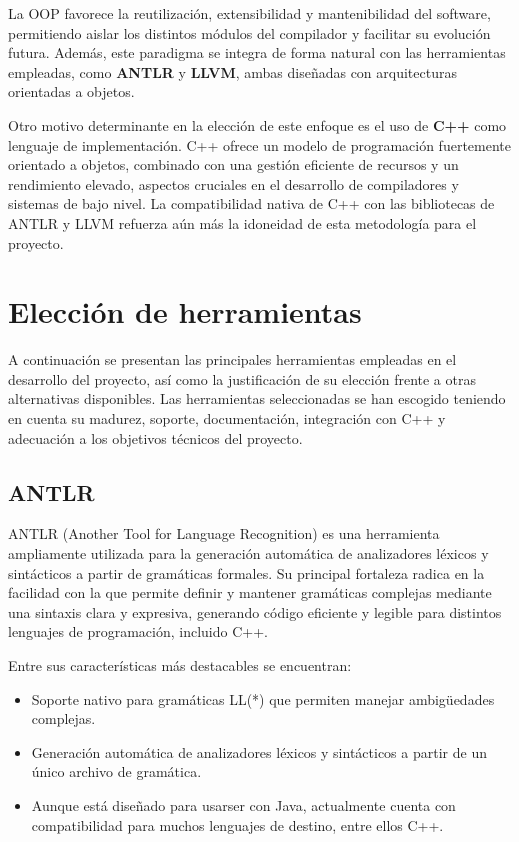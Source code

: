 La OOP favorece la reutilización, extensibilidad y mantenibilidad del software, permitiendo aislar los distintos módulos del compilador y facilitar su evolución futura. Además, este paradigma se integra de forma natural con las herramientas empleadas, como \textbf{ANTLR} y \textbf{LLVM}, ambas diseñadas con arquitecturas orientadas a objetos.

Otro motivo determinante en la elección de este enfoque es el uso de \textbf{C++} como lenguaje de implementación. C++ ofrece un modelo de programación fuertemente orientado a objetos, combinado con una gestión eficiente de recursos y un rendimiento elevado, aspectos cruciales en el desarrollo de compiladores y sistemas de bajo nivel. La compatibilidad nativa de C++ con las bibliotecas de ANTLR y LLVM refuerza aún más la idoneidad de esta metodología para el proyecto.


\section{Elección de herramientas}
A continuación se presentan las principales herramientas empleadas en el desarrollo del proyecto, así como la justificación de su elección frente a otras alternativas disponibles. Las herramientas seleccionadas se han escogido teniendo en cuenta su madurez, soporte, documentación, integración con C++ y adecuación a los objetivos técnicos del proyecto.

\subsection{ANTLR}
ANTLR (Another Tool for Language Recognition) es una herramienta ampliamente utilizada para la generación automática de analizadores léxicos y sintácticos a partir de gramáticas formales. Su principal fortaleza radica en la facilidad con la que permite definir y mantener gramáticas complejas mediante una sintaxis clara y expresiva, generando código eficiente y legible para distintos lenguajes de programación, incluido C++.

Entre sus características más destacables se encuentran:
\begin{itemize}
    \item Soporte nativo para gramáticas LL(*) que permiten manejar ambigüedades complejas.
    \item Generación automática de analizadores léxicos y sintácticos a partir de un único archivo de gramática.
    \item Aunque está diseñado para usarser con Java, actualmente cuenta con compatibilidad para muchos lenguajes de destino, entre ellos C++.
\end{itemize}

